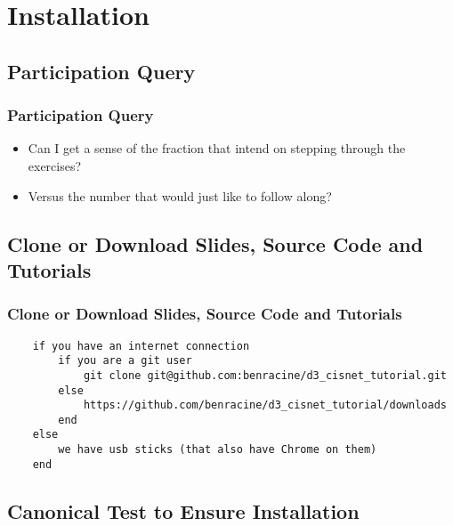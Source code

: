 \documentclass{beamer}
\begin{document}
\section{Installation}

\subsection{Participation Query}

\begin{frame}[fragile]
    \frametitle{Participation Query}
    \begin{itemize}
    \item Can I get a sense of the fraction that intend on stepping through the exercises?
\pause
    \item Versus the number that would just like to follow along?
    \end{itemize}
\end{frame}


\subsection{Clone or Download Slides, Source Code and Tutorials}

\begin{frame}[fragile]
    \frametitle{Clone or Download Slides, Source Code and Tutorials}
        \tiny{
        \begin{verbatim}
    if you have an internet connection
        if you are a git user
            git clone git@github.com:benracine/d3_cisnet_tutorial.git
        else
            https://github.com/benracine/d3_cisnet_tutorial/downloads
        end
    else
        we have usb sticks (that also have Chrome on them)
    end
        \end{verbatim}
        }
\end{frame}


\subsection{Canonical Test to Ensure Installation}
\end{document}
